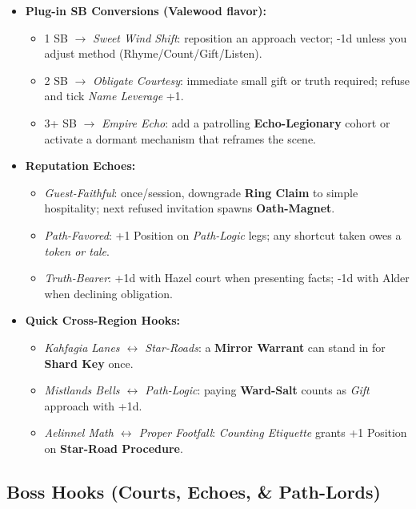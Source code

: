 \begin{itemize}
  \item \textbf{Plug-in SB Conversions (Valewood flavor):}
  \begin{itemize}
    \item 1 SB \(\rightarrow\) \emph{Sweet Wind Shift}: reposition an approach vector; -1d unless you adjust method (Rhyme/Count/Gift/Listen).
    \item 2 SB \(\rightarrow\) \emph{Obligate Courtesy}: immediate small gift or truth required; refuse and tick \emph{Name Leverage} +1.
    \item 3+ SB \(\rightarrow\) \emph{Empire Echo}: add a patrolling \textbf{Echo-Legionary} cohort or activate a dormant mechanism that reframes the scene.
  \end{itemize}

  \item \textbf{Reputation Echoes:}
  \begin{itemize}
    \item \emph{Guest-Faithful}: once/session, downgrade \textbf{Ring Claim} to simple hospitality; next refused invitation spawns \textbf{Oath-Magnet}.
    \item \emph{Path-Favored}: +1 Position on \emph{Path-Logic} legs; any shortcut taken owes a \emph{token or tale}.
    \item \emph{Truth-Bearer}: +1d with Hazel court when presenting facts; -1d with Alder when declining obligation.
  \end{itemize}

  \item \textbf{Quick Cross-Region Hooks:}
  \begin{itemize}
    \item \emph{Kahfagia Lanes \(\leftrightarrow\) Star-Roads}: a \textbf{Mirror Warrant} can stand in for \textbf{Shard Key} once.
    \item \emph{Mistlands Bells \(\leftrightarrow\) Path-Logic}: paying \textbf{Ward-Salt} counts as \emph{Gift} approach with +1d.
    \item \emph{Aelinnel Math \(\leftrightarrow\) Proper Footfall}: \emph{Counting Etiquette} grants +1 Position on \textbf{Star-Road Procedure}.
  \end{itemize}
\end{itemize}


\subsection*{Boss Hooks (Courts, Echoes, \& Path-Lords)}
\label{sec:valewood-bosses}

